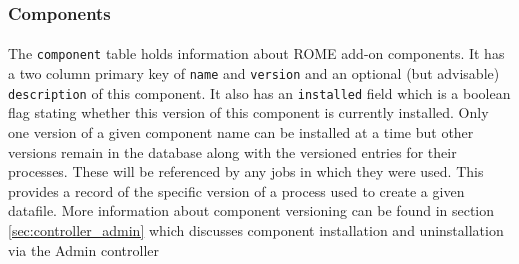\subsubsection{Components}
\label{sec:model_components}

\paragraph{}
The \texttt{component} table holds information about ROME add-on components. It has a two column primary key of \texttt{name} and \texttt{version} and an optional (but advisable) \texttt{description} of this component. It also has an \texttt{installed} field which is a boolean flag stating whether this version of this component is currently installed. Only one version of a given component name can be installed at a time but other versions remain in the database along with the versioned entries for their processes. These will be referenced by any jobs in which they were used. This provides a record of the specific version of a process used to create a given datafile. More information about component versioning can be found in section \ref{sec:controller_admin} which discusses component installation and uninstallation via the Admin controller 
